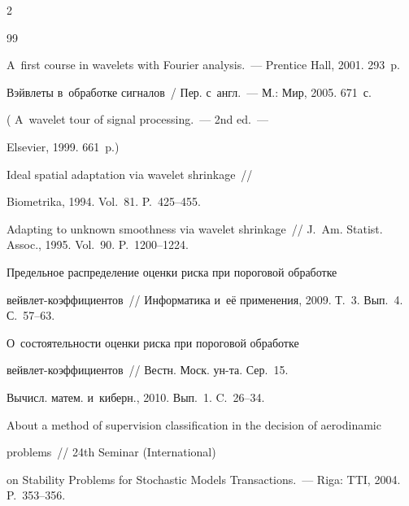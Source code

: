 \begin{multicols}{2}
{{\begin{thebibliography}{99}


    A~first course in wavelets with Fourier analysis.~--- Prentice Hall, 2001. 293~p.





    Вэйвлеты в~обработке сигналов~/ Пер. с~англ.~--- М.: Мир, 2005. 671~с.

    ( A~wavelet tour of signal processing.~--- 2nd ed.~---

    Elsevier, 1999. 661~p.)


 Ideal spatial adaptation via wavelet shrinkage~// 

Biometrika, 1994. Vol.~81. P.~425--455.

    



Adapting to unknown smoothness via wavelet shrinkage~// J.~Am. Statist. Assoc., 1995. Vol.~90. P.~1200--1224.






 Предельное распределение оценки риска при пороговой обработке 

вей\-в\-лет-ко\-эф\-фи\-ци\-ен\-тов~// Информатика и~её применения, 2009. Т.~3. Вып.~4. С.~57--63.





О~состоятельности оценки риска при пороговой обработке 

вей\-в\-лет-ко\-эф\-фи\-ци\-ен\-тов~// Вестн. Моск. ун-та. Сер.~15. 

Вычисл. матем. и~киберн., 2010. Вып.~1. C.~26--34.



    About a method of supervision classification in the decision of aerodinamic 

    problems~// 24th Seminar (International)

    on Stability Problems for Stochastic Models Transactions.~--- Riga: TTI, 2004. P.~353--356.


\end{thebibliography}}}
\end{multicols}
